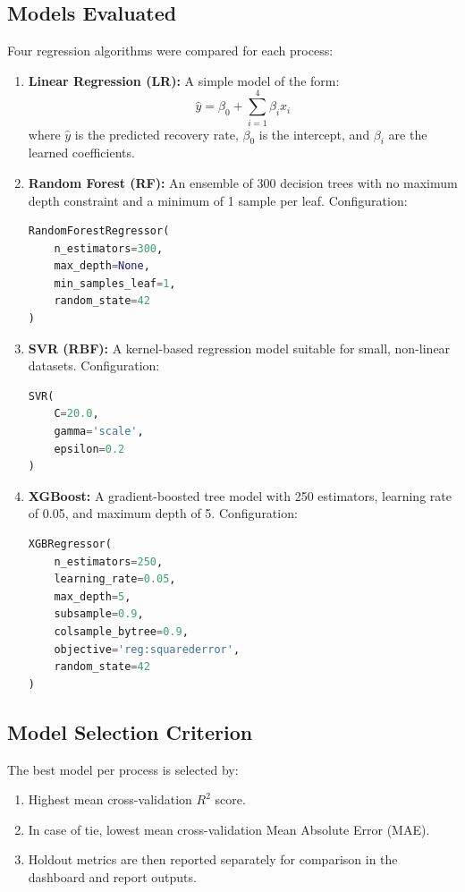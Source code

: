 \documentclass[12pt,a4paper]{report}
\begin{document}
\subsection{Models Evaluated}
Four regression algorithms were compared for each process:
\begin{enumerate}
  \item \textbf{Linear Regression (LR):} A simple model of the form:
  \begin{equation}
    \hat{y} = \beta_0 + \sum_{i=1}^{4} \beta_i x_i
    \label{eq:linear}
  \end{equation}
  where $\hat{y}$ is the predicted recovery rate, $\beta_0$ is the intercept, and $\beta_i$ are the learned coefficients.
  \item \textbf{Random Forest (RF):} An ensemble of 300 decision trees with no maximum depth constraint and a minimum of 1 sample per leaf. Configuration:
  \begin{lstlisting}[language=Python, caption={Random Forest hyperparameters.}]
RandomForestRegressor(
    n_estimators=300,
    max_depth=None,
    min_samples_leaf=1,
    random_state=42
)
  \end{lstlisting}
  \item \textbf{SVR (RBF):} A kernel-based regression model suitable for small, non-linear datasets. Configuration:
  \begin{lstlisting}[language=Python, caption={SVR hyperparameters.}]
SVR(
    C=20.0,
    gamma='scale',
    epsilon=0.2
)
  \end{lstlisting}
  \item \textbf{XGBoost:} A gradient-boosted tree model with 250 estimators, learning rate of 0.05, and maximum depth of 5. Configuration:
  \begin{lstlisting}[language=Python, caption={XGBoost hyperparameters.}]
XGBRegressor(
    n_estimators=250,
    learning_rate=0.05,
    max_depth=5,
    subsample=0.9,
    colsample_bytree=0.9,
    objective='reg:squarederror',
    random_state=42
)
  \end{lstlisting}
\end{enumerate}
\subsection{Model Selection Criterion}
The best model per process is selected by:
\begin{enumerate}[nosep]
  \item Highest mean cross-validation $R^2$ score.
  \item In case of tie, lowest mean cross-validation Mean Absolute Error (MAE).
  \item Holdout metrics are then reported separately for comparison in the dashboard and report outputs.
\end{enumerate}
\end{document}
